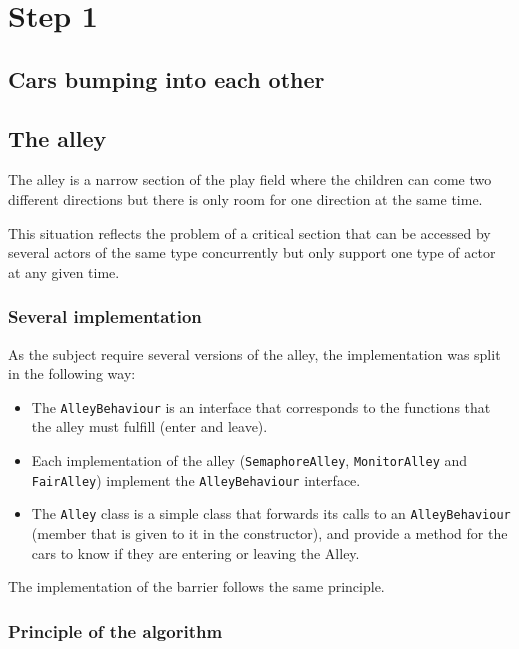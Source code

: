 


\section{Step 1}

\subsection{Cars bumping into each other} %

\subsection{The alley} %

The alley is a narrow section of the play field where the children can come two
different directions but there is only room for one direction at the same time.

This situation reflects the problem of a critical section that can be accessed
by several actors of the same type concurrently but only support one type of
actor at any given time.

\subsubsection{Several implementation}

As the subject require several versions of the alley, the implementation was
split in the following way:
\begin{itemize}
    \item The \texttt{AlleyBehaviour} is an interface that corresponds to the
    functions that the alley must fulfill (enter and leave).
    \item Each implementation of the alley (\texttt{SemaphoreAlley},
            \texttt{MonitorAlley} and \texttt{FairAlley}) implement the
            \texttt{AlleyBehaviour} interface.
    \item The \texttt{Alley} class is a simple class that forwards its calls to
    an \texttt{AlleyBehaviour} (member that is given to it in the constructor),
    and provide a method for the cars to know if they are entering or leaving
    the Alley.
\end{itemize}
    
The implementation of the barrier follows the same principle.

\subsubsection{Principle of the algorithm}

